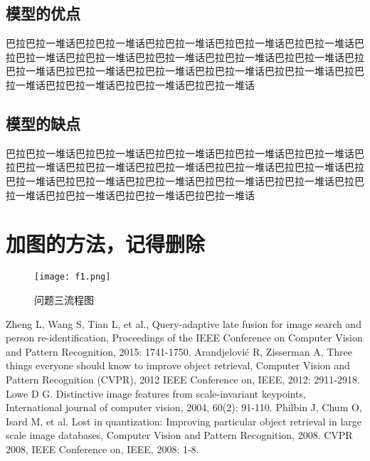 \documentclass[bwprint]{gmcmthesis}
\begin{document}
\subsection{模型的优点}
巴拉巴拉一堆话巴拉巴拉一堆话巴拉巴拉一堆话巴拉巴拉一堆话巴拉巴拉一堆话巴拉巴拉一堆话巴拉巴拉一堆话巴拉巴拉一堆话巴拉巴拉一堆话巴拉巴拉一堆话巴拉巴拉一堆话巴拉巴拉一堆话巴拉巴拉一堆话巴拉巴拉一堆话巴拉巴拉一堆话巴拉巴拉一堆话巴拉巴拉一堆话巴拉巴拉一堆话巴拉巴拉一堆话



\subsection{模型的缺点}
巴拉巴拉一堆话巴拉巴拉一堆话巴拉巴拉一堆话巴拉巴拉一堆话巴拉巴拉一堆话巴拉巴拉一堆话巴拉巴拉一堆话巴拉巴拉一堆话巴拉巴拉一堆话巴拉巴拉一堆话巴拉巴拉一堆话巴拉巴拉一堆话巴拉巴拉一堆话巴拉巴拉一堆话巴拉巴拉一堆话巴拉巴拉一堆话巴拉巴拉一堆话巴拉巴拉一堆话巴拉巴拉一堆话






\section{加图的方法，记得删除}
\begin{figure}[!h]
\centering
\texttt{[image: f1.png]}
\caption{问题三流程图}
\end{figure}




\newpage



\begin{thebibliography}{99}  
Zheng L, Wang S, Tian L, et al., Query-adaptive late fusion for image search and person re-identification, Proceedings of the IEEE Conference on Computer Vision and Pattern Recognition, 2015: 1741-1750.  
Arandjelović R, Zisserman A, Three things everyone should know to improve object retrieval, Computer Vision and Pattern Recognition (CVPR), 2012 IEEE Conference on, IEEE, 2012: 2911-2918.  
Lowe D G. Distinctive image features from scale-invariant keypoints, International journal of computer vision, 2004, 60(2): 91-110.  
Philbin J, Chum O, Isard M, et al. Lost in quantization: Improving particular object retrieval in large scale image databases, Computer Vision and Pattern Recognition, 2008. CVPR 2008, IEEE Conference on, IEEE, 2008: 1-8.  
\end{thebibliography}
\end{document}
